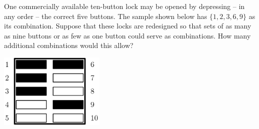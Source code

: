 One commercially available ten-button lock may be opened by depressing -- in any order -- the correct five buttons.  The sample shown below has $\{1, 2, 3, 6, 9\}$ as its combination.  Suppose that these locks are redesigned so that sets of as many as nine buttons or as few as one button could serve as combinations.  How many additional combinations would this allow?

\begin{center}
\includegraphics[width = 50.400000000000006mm]{img/fig0.png}
\end{center}